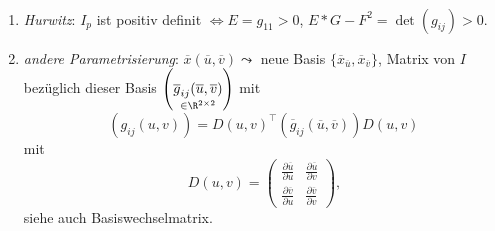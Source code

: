 \begin{remark}
  \
  \begin{enumerate}
    \item \emph{Hurwitz}: \( I_p \) ist positiv definit \( \Leftrightarrow E = g_{11} > 0 \), \( E*G-F^2 = \det(g_{ij}) > 0 \).
    \item \emph{andere Parametrisierung}: \( \overline{x}(\overline{u},\overline{v}) \leadsto \) neue Basis \( \{ \overline{x}_{\overline{u}}, \overline{x}_{\overline{v}} \} \), Matrix von \( I \) bezüglich dieser Basis \( \left( \underset{\in \R^{2\times 2}}{\overline{g}_{ij}(\overline{u}, \overline{v})} \right) \) mit
    \begin{equation*}
      \left( g_{ij}(u,v) \right) = D{(u,v)}^\top(\overline{g}_{ij}(\overline{u},\overline{v}))D(u,v)
    \end{equation*}
    mit 
    \begin{equation*}
      D(u,v) = \begin{pmatrix}
        \frac{\partial \overline{u}}{\partial u} & \frac{\partial \overline{u}}{\partial v} \\
        \frac{\partial \overline{v}}{\partial u} & \frac{\partial \overline{v}}{\partial v}
      \end{pmatrix}\text{,}
    \end{equation*}
    siehe auch Basiswechselmatrix.
  \end{enumerate}
\end{remark}

